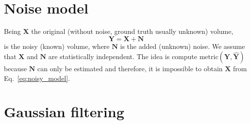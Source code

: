 \documentclass{article}
\begin{document}
\section{Noise model}

Being $\mathbf{X}$ the original (without noise, ground truth usually unknown) volume,
\begin{equation}
  \mathbf{Y} = \mathbf{X} + \mathbf{N}
  \label{eq:noisy_model}
\end{equation}
is the noisy (known) volume, where $\mathbf{N}$ is the added (unknown)
noise. We assume that $\mathbf{X}$ and $\mathbf{N}$ are statistically
independent. The idea is compute
$\text{metric}(\mathbf{Y}, \hat{\mathbf{Y}})$ because $\mathbf{N}$ can
only be estimated and therefore, it is impossible to obtain
$\mathbf{X}$ from Eq.~\ref{eq:noisy_model}.

\section{Gaussian filtering}



\end{document}
